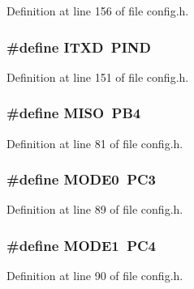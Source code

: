 Definition at line 156 of file config.\-h.

\hypertarget{group__biba__config_ga251454338fb90e437951f785af82f31a}{
\subsubsection[{I\-T\-X\-D}]{\setlength{\rightskip}{0pt plus 5cm}\#define I\-T\-X\-D~P\-I\-N\-D}}\label{group__biba__config_ga251454338fb90e437951f785af82f31a}


Definition at line 151 of file config.\-h.

\hypertarget{group__biba__config_ga7334c540878c8c4d801fd75ed9fd8063}{
\subsubsection[{M\-I\-S\-O}]{\setlength{\rightskip}{0pt plus 5cm}\#define M\-I\-S\-O~P\-B4}}\label{group__biba__config_ga7334c540878c8c4d801fd75ed9fd8063}


Definition at line 81 of file config.\-h.

\hypertarget{group__biba__config_ga5daa4b780b82b5e8678d8c7095336b62}{
\subsubsection[{M\-O\-D\-E0}]{\setlength{\rightskip}{0pt plus 5cm}\#define M\-O\-D\-E0~P\-C3}}\label{group__biba__config_ga5daa4b780b82b5e8678d8c7095336b62}


Definition at line 89 of file config.\-h.

\hypertarget{group__biba__config_ga443b1268c43b309560d57e34d50b5b3b}{
\subsubsection[{M\-O\-D\-E1}]{\setlength{\rightskip}{0pt plus 5cm}\#define M\-O\-D\-E1~P\-C4}}\label{group__biba__config_ga443b1268c43b309560d57e34d50b5b3b}


Definition at line 90 of file config.\-h.

